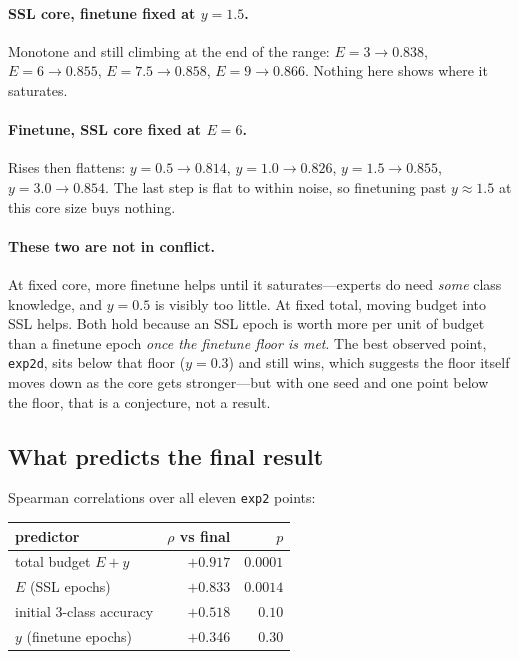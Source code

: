 \documentclass[11pt,a4paper]{article}
\newcommand{\code}[1]{\texttt{\small #1}}
\begin{document}
\paragraph{SSL core, finetune fixed at $y = 1.5$.} Monotone and still climbing
at the end of the range:
$E{=}3 \to 0.838$, $E{=}6 \to 0.855$, $E{=}7.5 \to 0.858$, $E{=}9 \to 0.866$.
Nothing here shows where it saturates.

\paragraph{Finetune, SSL core fixed at $E = 6$.} Rises then flattens:
$y{=}0.5 \to 0.814$, $y{=}1.0 \to 0.826$, $y{=}1.5 \to 0.855$,
$y{=}3.0 \to 0.854$. The last step is flat to within noise, so finetuning past
$y \approx 1.5$ at this core size buys nothing.

\paragraph{These two are not in conflict.} At fixed core, more finetune helps
until it saturates---experts do need \emph{some} class knowledge, and $y{=}0.5$
is visibly too little. At fixed total, moving budget into SSL helps. Both hold
because an SSL epoch is worth more per unit of budget than a finetune epoch
\emph{once the finetune floor is met}. The best observed point, \code{exp2d},
sits below that floor ($y{=}0.3$) and still wins, which suggests the floor
itself moves down as the core gets stronger---but with one seed and one point
below the floor, that is a conjecture, not a result.

\subsection{What predicts the final result}

Spearman correlations over all eleven \code{exp2} points:

\begin{center}
\begin{tabular}{@{}lrr@{}}
\toprule
\textbf{predictor} & \textbf{$\rho$ vs final} & \textbf{$p$} \\
\midrule
total budget $E+y$ & $+0.917$ & $0.0001$ \\
$E$ (SSL epochs) & $+0.833$ & $0.0014$ \\
initial 3-class accuracy & $+0.518$ & $0.10$ \\
$y$ (finetune epochs) & $+0.346$ & $0.30$ \\
\bottomrule
\end{tabular}
\end{center}
\end{document}

